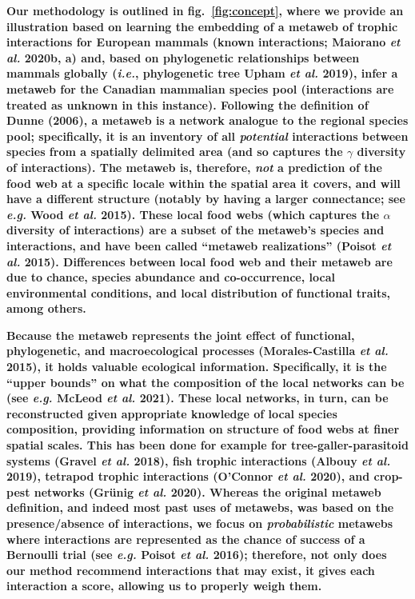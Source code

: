 \documentclass[11pt]{article}
\providecommand{\DIFaddtex}[1]{{\bf #1}} %
\providecommand{\DIFadd}[1]{\texorpdfstring{\DIFaddtex{#1}}{#1}} %
\begin{document}
\DIFadd{Our methodology is outlined in fig.~\ref{fig:concept}, where we provide
an illustration based on learning the embedding of a metaweb of trophic
interactions for European mammals (known interactions; Maiorano \emph{et
al.} 2020b, a) and, based on phylogenetic relationships between mammals
globally (\emph{i.e.}, phylogenetic tree Upham \emph{et al.} 2019),
infer a metaweb for the Canadian mammalian species pool (interactions
are treated as unknown in this instance). Following the definition of
Dunne (2006), a metaweb is a network analogue to the regional species
pool; specifically, it is an inventory of all \emph{potential}
interactions between species from a spatially delimited area (and so
captures the \(\gamma\) diversity of interactions). The metaweb is,
therefore, \emph{not} a prediction of the food web at a specific locale
within the spatial area it covers, and will have a different structure
(notably by having a larger connectance; see \emph{e.g.} Wood \emph{et
al.} 2015). These local food webs (which captures the \(\alpha\)
diversity of interactions) are a subset of the metaweb's species and
interactions, and have been called ``metaweb realizations'' (Poisot
\emph{et al.} 2015). Differences between local food web and their
metaweb are due to chance, species abundance and co-occurrence, local
environmental conditions, and local distribution of functional traits,
among others.
}

\DIFadd{Because the metaweb represents the joint effect of functional,
phylogenetic, and macroecological processes (Morales-Castilla \emph{et
al.} 2015), it holds valuable ecological information. Specifically, it
is the ``upper bounds'' on what the composition of the local networks
can be (see \emph{e.g.} McLeod \emph{et al.} 2021). These local
networks, in turn, can be reconstructed given appropriate knowledge of
local species composition, providing information on structure of food
webs at finer spatial scales. This has been done for example for
tree-galler-parasitoid systems (Gravel \emph{et al.} 2018), fish trophic
interactions (Albouy \emph{et al.} 2019), tetrapod trophic interactions
(O'Connor \emph{et al.} 2020), and crop-pest networks (Grünig \emph{et
al.} 2020). Whereas the original metaweb definition, and indeed most
past uses of metawebs, was based on the presence/absence of
interactions, we focus on \emph{probabilistic} metawebs where
interactions are represented as the chance of success of a Bernoulli
trial (see \emph{e.g.} Poisot \emph{et al.} 2016); therefore, not only
does our method recommend interactions that may exist, it gives each
interaction a score, allowing us to properly weigh them.
}
\end{document}
